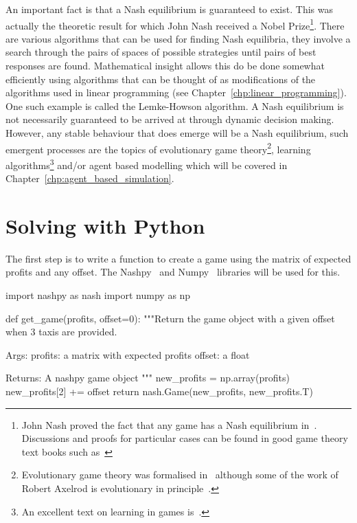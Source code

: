 An important fact is that a Nash equilibrium is guaranteed to exist.
This was actually the theoretic result for which John Nash
received a Nobel Prize\footnote{
John Nash proved the fact that any game has a Nash equilibrium
in~\cite{nash1950equilibrium}. Discussions and proofs for particular cases
can be found in good game theory text books such as~\cite{maschler2013game}
}.
There are various algorithms that can be used for finding Nash equilibria, they
involve a search through the pairs of spaces of possible strategies until pairs
of best responses are found. Mathematical insight allows this do be done
somewhat efficiently using algorithms that can be thought of as modifications of
the algorithms used in linear programming (see
Chapter~\ref{chp:linear_programming}).
One such example is called the Lemke-Howson algorithm.
A Nash equilibrium is not necessarily guaranteed to be arrived at through
dynamic decision making. However, any stable behaviour that
does emerge will be a Nash equilibrium, such emergent processes are the topics
of evolutionary game theory\footnote{
Evolutionary game theory was formalised in~\cite{smith1974theory} although
some of the work of Robert Axelrod is evolutionary in
principle~\cite{axelrod1990evolution}.
},
learning algorithms\footnote{
An excellent text on learning in games is~\cite{fudenberg1998theory}.
}
and/or agent based modelling which will be covered in
Chapter~\ref{chp:agent_based_simulation}.

\section{Solving with Python}\label{sec:game_theory_solving-with-python}

The first step is to write a function to create a game using the
matrix of expected profits and any offset. The Nashpy~\cite{knight2018nashpy}
and Numpy~\cite{harris2020array} libraries will be used for this.

\begin{pyin}
import nashpy as nash
import numpy as np


def get_game(profits, offset=0):
    """Return the game object with a given offset when 3 taxis are
    provided.

    Args:
        profits: a matrix with expected profits
        offset: a float

    Returns:
        A nashpy game object
    """
    new_profits = np.array(profits)
    new_profits[2] += offset
    return nash.Game(new_profits, new_profits.T)
\end{pyin}


